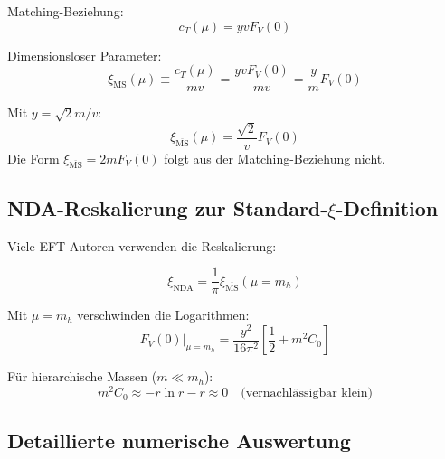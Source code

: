 	Matching-Beziehung:
	\begin{equation}
		c_T(\mu) = y v F_V(0)
	\end{equation}
	
	Dimensionsloser Parameter:
	\begin{equation}
		\xi_{\overline{\text{MS}}}(\mu) \equiv \frac{c_T(\mu)}{mv} = \frac{yvF_V(0)}{mv} = \frac{y}{m}F_V(0)
	\end{equation}
	
	Mit $y = \sqrt{2} m/v$:
	\begin{equation}
		\xi_{\overline{\text{MS}}}(\mu) = \frac{\sqrt{2}}{v}F_V(0)
	\end{equation}
	Die Form $\xi_{\overline{\text{MS}}} = 2mF_V(0)$ folgt aus der Matching-Beziehung nicht.
	
	\subsection{NDA-Reskalierung zur Standard-$\xi$-Definition}
	
	Viele EFT-Autoren verwenden die Reskalierung:
	
	\begin{equation}
		\xi_{\text{NDA}} = \frac{1}{\pi} \xi_{\overline{\text{MS}}}(\mu = m_h)
	\end{equation}
	
	Mit $\mu = m_h$ verschwinden die Logarithmen:
	\begin{equation}
		F_V(0)|_{\mu=m_h} = \frac{y^2}{16\pi^2}\left[\frac{1}{2} + m^2C_0\right]
	\end{equation}
	
	Für hierarchische Massen ($m \ll m_h$):
	\begin{equation}
		m^2C_0 \approx -r \ln r - r \approx 0 \quad \text{(vernachlässigbar klein)}
	\end{equation}
	
	\subsection{Detaillierte numerische Auswertung}
	
